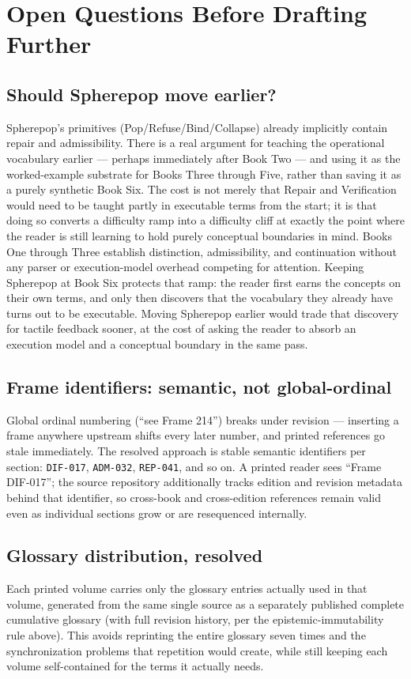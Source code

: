 \documentclass[11pt]{article}
\begin{document}
\section*{Open Questions Before Drafting Further}

\subsection*{Should Spherepop move earlier?}
Spherepop's primitives (Pop/Refuse/Bind/Collapse) already implicitly contain repair and admissibility. There is a real argument for teaching the operational vocabulary earlier --- perhaps immediately after Book Two --- and using it as the worked-example substrate for Books Three through Five, rather than saving it as a purely synthetic Book Six. The cost is not merely that Repair and Verification would need to be taught partly in executable terms from the start; it is that doing so converts a difficulty ramp into a difficulty cliff at exactly the point where the reader is still learning to hold purely conceptual boundaries in mind. Books One through Three establish distinction, admissibility, and continuation without any parser or execution-model overhead competing for attention. Keeping Spherepop at Book Six protects that ramp: the reader first earns the concepts on their own terms, and only then discovers that the vocabulary they already have turns out to be executable. Moving Spherepop earlier would trade that discovery for tactile feedback sooner, at the cost of asking the reader to absorb an execution model and a conceptual boundary in the same pass.

\subsection*{Frame identifiers: semantic, not global-ordinal}
Global ordinal numbering (``see Frame 214'') breaks under revision --- inserting a frame anywhere upstream shifts every later number, and printed references go stale immediately. The resolved approach is stable semantic identifiers per section: \texttt{DIF-017}, \texttt{ADM-032}, \texttt{REP-041}, and so on. A printed reader sees ``Frame DIF-017''; the source repository additionally tracks edition and revision metadata behind that identifier, so cross-book and cross-edition references remain valid even as individual sections grow or are resequenced internally.

\subsection*{Glossary distribution, resolved}
Each printed volume carries only the glossary entries actually used in that volume, generated from the same single source as a separately published complete cumulative glossary (with full revision history, per the epistemic-immutability rule above). This avoids reprinting the entire glossary seven times and the synchronization problems that repetition would create, while still keeping each volume self-contained for the terms it actually needs.
\end{document}
